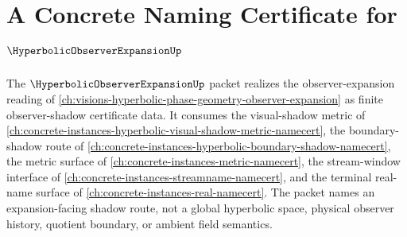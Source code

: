\chapter{A Concrete Naming Certificate for $\HyperbolicObserverExpansionUp$}
\label{ch:concrete-instances-hyperbolic-observer-expansion-namecert}

The $\HyperbolicObserverExpansionUp$ packet realizes the observer-expansion reading of \autoref{ch:visions-hyperbolic-phase-geometry-observer-expansion} as finite observer-shadow certificate data. It consumes the visual-shadow metric of \autoref{ch:concrete-instances-hyperbolic-visual-shadow-metric-namecert}, the boundary-shadow route of \autoref{ch:concrete-instances-hyperbolic-boundary-shadow-namecert}, the metric surface of \autoref{ch:concrete-instances-metric-namecert}, the stream-window interface of \autoref{ch:concrete-instances-streamname-namecert}, and the terminal real-name surface of \autoref{ch:concrete-instances-real-namecert}. The packet names an expansion-facing shadow route, not a global hyperbolic space, physical observer history, quotient boundary, or ambient field semantics.

